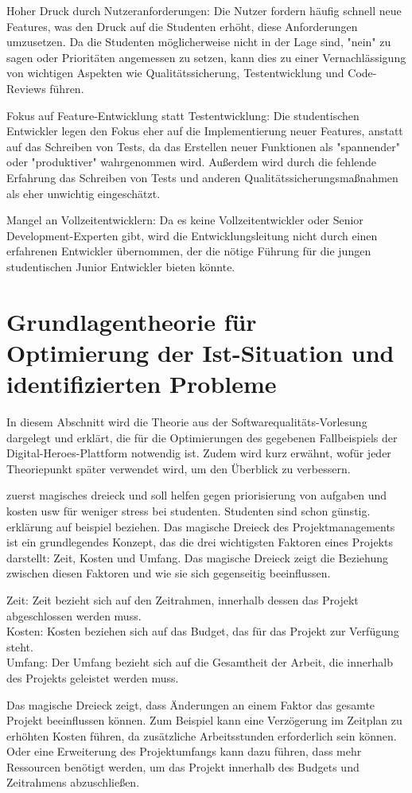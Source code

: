 Hoher Druck durch Nutzeranforderungen: Die Nutzer fordern häufig schnell neue Features, 
was den Druck auf die Studenten erhöht, diese Anforderungen umzusetzen. 
Da die Studenten möglicherweise nicht in der Lage sind, 
"nein" zu sagen oder Prioritäten angemessen zu setzen, 
kann dies zu einer Vernachlässigung von wichtigen Aspekten wie Qualitätssicherung, 
Testentwicklung und Code-Reviews führen. 

Fokus auf Feature-Entwicklung statt Testentwicklung: Die studentischen Entwickler legen den Fokus eher auf 
die Implementierung neuer Features, anstatt auf das Schreiben von Tests, 
da das Erstellen neuer Funktionen als "spannender" oder "produktiver" wahrgenommen wird. 
Außerdem wird durch die fehlende Erfahrung das Schreiben von Tests und anderen 
Qualitätssicherungsmaßnahmen als eher unwichtig eingeschätzt. 

Mangel an Vollzeitentwicklern: Da es keine Vollzeitentwickler oder Senior Development-Experten gibt,
wird die Entwicklungsleitung nicht durch einen erfahrenen Entwickler übernommen, 
der die nötige Führung für die jungen studentischen Junior Entwickler bieten könnte.

\section{Grundlagentheorie für Optimierung der Ist-Situation und identifizierten Probleme}

In diesem Abschnitt wird die Theorie aus der Softwarequalitäts-Vorlesung 
dargelegt und erklärt, die für die Optimierungen des gegebenen 
Fallbeispiels der Digital-Heroes-Plattform notwendig ist. 
Zudem wird kurz erwähnt, wofür jeder Theoriepunkt später verwendet wird, 
um den Überblick zu verbessern. 

zuerst magisches dreieck und soll helfen gegen priorisierung von aufgaben und kosten usw
für weniger stress bei studenten. Studenten sind schon günstig. erklärung auf beispiel beziehen.
Das magische Dreieck des Projektmanagements ist ein grundlegendes Konzept, 
das die drei wichtigsten Faktoren eines Projekts darstellt: Zeit, Kosten und Umfang. 
Das magische Dreieck zeigt die Beziehung zwischen diesen Faktoren und wie sie sich gegenseitig beeinflussen.

Zeit: Zeit bezieht sich auf den Zeitrahmen, innerhalb dessen das Projekt abgeschlossen werden muss. \\
Kosten: Kosten beziehen sich auf das Budget, das für das Projekt zur Verfügung steht. \\
Umfang: Der Umfang bezieht sich auf die Gesamtheit der Arbeit, die innerhalb des Projekts geleistet werden muss.

Das magische Dreieck zeigt, dass Änderungen an einem Faktor das gesamte Projekt beeinflussen können. 
Zum Beispiel kann eine Verzögerung im Zeitplan zu erhöhten Kosten führen, 
da zusätzliche Arbeitsstunden erforderlich sein können. 
Oder eine Erweiterung des Projektumfangs kann dazu führen, dass mehr Ressourcen benötigt werden, 
um das Projekt innerhalb des Budgets und Zeitrahmens abzuschließen.